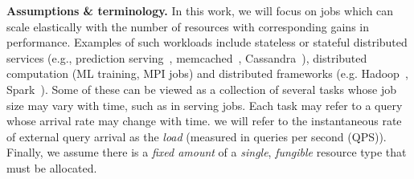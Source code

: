

\insertFigScheme
\textbf{Assumptions \& terminology.}
In this work, %
 we will focus on jobs which can scale elastically with the
number of resources with corresponding gains in performance.
Examples of such workloads include stateless or stateful distributed services
(e.g., prediction serving~\cite{crankshaw2017clipper},
memcached~\cite{fitzpatrick2004distributed},
Cassandra~\cite{lakshman2010cassandra}),
distributed computation (ML training, MPI jobs)
and distributed frameworks
(e.g. Hadoop~\cite{shvachko2010hadoop}, Spark~\cite{spark}).
Some of these can be viewed as a collection of several tasks whose job size may vary with
time,
such as in serving jobs. Each task may refer to a query whose arrival rate may change with
time.
we will refer to the instantaneous rate of external query arrival as the \emph{load}
(measured in queries per second (QPS)).
Finally, we assume there is a \emph{fixed amount} of a \emph{single}, \emph{fungible}
resource type that must be allocated.


\newcommand{\moduleheader}[1]{\textbf{#1.}}



